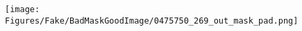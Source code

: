 \documentclass[runningheads]{llncs}
\begin{document}
\begin{figure}[tb]
\texttt{[image: Figures/Fake/BadMaskGoodImage/0475750\_269\_out\_mask\_pad.png]} \\%
\end{figure}
\end{document}
